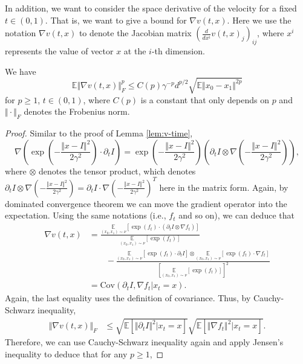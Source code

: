 In addition, we want to consider the space derivative of the velocity for a fixed $t\in(0,1)$. That is, we want to give a bound for $\nabla v(t,x)$. Here we use the notation $\nabla v(t,x)$ to denote the Jacobian matrix $\left(\frac{d}{dx^i}v(t,x)_j\right)_{ij}$, where $x^i$ represents the value of vector $x$ at the $i$-th dimension.

\begin{lemma}
    We have $$\mathbb{E}\Vert\nabla v(t,x)\Vert_F^p\le C(p)\gamma^{-p}d^{p/2}\sqrt{\mathbb{E}\Vert x_0-x_1\Vert^{2p}}$$
    for $p\ge1$, $t\in(0,1)$, where $C(p)$ is a constant that only depends on $p$ and $\Vert\cdot\Vert_F$ denotes the Frobenius norm.
    \label{lem:v-space}
\end{lemma}

\begin{proof}
    Similar to the proof of Lemma \ref{lem:v-time}, $$\nabla\left(\exp\left(-\frac{\Vert x-I\Vert^2}{2\gamma^2}\right)\cdot\partial_tI\right)=\exp\left(-\frac{\Vert x-I\Vert^2}{2\gamma^2}\right)\left(\partial_tI\otimes\nabla\left(-\frac{\Vert x-I\Vert^2}{2\gamma^2}\right)\right),$$
    where $\otimes$ denotes the tensor product, which denotes $\partial_tI\otimes\nabla\left(-\frac{\Vert x-I\Vert^2}{2\gamma^2}\right)=\partial_tI\cdot\nabla\left(-\frac{\Vert x-I\Vert^2}{2\gamma^2}\right)^T$ here in the matrix form. Again, by dominated convergence theorem we can move the gradient operator into the expectation. Using the same notations (i.e., $f_t$ and so on), we can deduce that
    $$\begin{aligned}
    \nabla v(t,x)&=\frac{\underset{(x_0,x_1)\sim\nu}{\mathbb{E}}[\exp(f_t)\cdot(\partial_tI\otimes\nabla f_t)]}{\underset{(x_0,x_1)\sim\nu}{\mathbb{E}}[\exp(f_t)]}\\
    &\qquad-\frac{\underset{(x_0,x_1)\sim\nu}{\mathbb{E}}[\exp(f_t)\cdot\partial_tI]\otimes\underset{(x_0,x_1)\sim\nu}{\mathbb{E}}[\exp(f_t)\cdot\nabla f_t]}{\left[\underset{(x_0,x_1)\sim\nu}{\mathbb{E}}[\exp(f_t)]\right]^2}\\
    &=\text{Cov}(\partial_tI,\nabla f_t|x_t=x).
    \end{aligned}$$
    Again, the last equality uses the definition of covariance. Thus, by Cauchy-Schwarz inequality,
    $$\begin{aligned}
        \Vert\nabla v(t,x)\Vert_F&\le\sqrt{\mathbb{E}[\Vert\partial_tI\Vert^2|x_t=x]}\sqrt{\mathbb{E}[\Vert\nabla f_t\Vert^2|x_t=x]}.
    \end{aligned}$$
    Therefore, we can use Cauchy-Schwarz inequality again and apply Jensen's inequality to deduce that for any $p\ge1$,

\end{proof}
